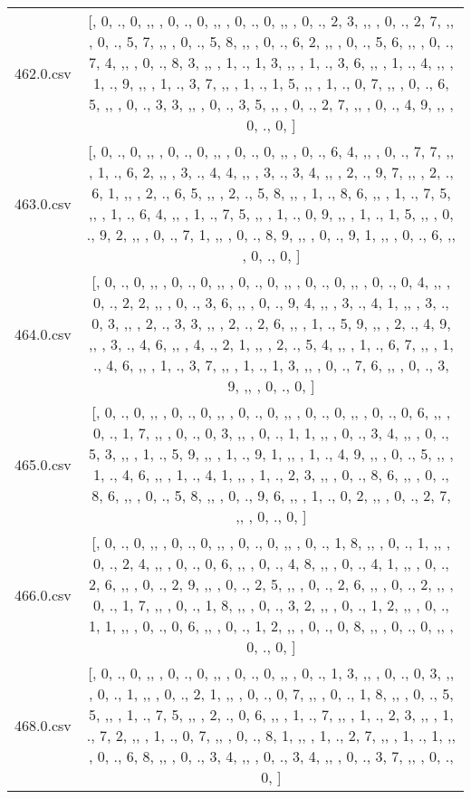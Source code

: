 \begin{table}[ht]
\begin{tabular}{@{}c c@{}}
	462.0.csv & [, 0, ., 0, ,,  , 0, ., 0, ,,  , 0, ., 0, ,,  , 0, ., 2, 3, ,,  , 0, ., 2, 7, ,,  , 0, ., 5, 7, ,,  , 0, ., 5, 8, ,,  , 0, ., 6, 2, ,,  , 0, ., 5, 6, ,,  , 0, ., 7, 4, ,,  , 0, ., 8, 3, ,,  , 1, ., 1, 3, ,,  , 1, ., 3, 6, ,,  , 1, ., 4, ,,  , 1, ., 9, ,,  , 1, ., 3, 7, ,,  , 1, ., 1, 5, ,,  , 1, ., 0, 7, ,,  , 0, ., 6, 5, ,,  , 0, ., 3, 3, ,,  , 0, ., 3, 5, ,,  , 0, ., 2, 7, ,,  , 0, ., 4, 9, ,,  , 0, ., 0, ]\\ 
	463.0.csv & [, 0, ., 0, ,,  , 0, ., 0, ,,  , 0, ., 0, ,,  , 0, ., 6, 4, ,,  , 0, ., 7, 7, ,,  , 1, ., 6, 2, ,,  , 3, ., 4, 4, ,,  , 3, ., 3, 4, ,,  , 2, ., 9, 7, ,,  , 2, ., 6, 1, ,,  , 2, ., 6, 5, ,,  , 2, ., 5, 8, ,,  , 1, ., 8, 6, ,,  , 1, ., 7, 5, ,,  , 1, ., 6, 4, ,,  , 1, ., 7, 5, ,,  , 1, ., 0, 9, ,,  , 1, ., 1, 5, ,,  , 0, ., 9, 2, ,,  , 0, ., 7, 1, ,,  , 0, ., 8, 9, ,,  , 0, ., 9, 1, ,,  , 0, ., 6, ,,  , 0, ., 0, ]\\ 
	464.0.csv & [, 0, ., 0, ,,  , 0, ., 0, ,,  , 0, ., 0, ,,  , 0, ., 0, ,,  , 0, ., 0, 4, ,,  , 0, ., 2, 2, ,,  , 0, ., 3, 6, ,,  , 0, ., 9, 4, ,,  , 3, ., 4, 1, ,,  , 3, ., 0, 3, ,,  , 2, ., 3, 3, ,,  , 2, ., 2, 6, ,,  , 1, ., 5, 9, ,,  , 2, ., 4, 9, ,,  , 3, ., 4, 6, ,,  , 4, ., 2, 1, ,,  , 2, ., 5, 4, ,,  , 1, ., 6, 7, ,,  , 1, ., 4, 6, ,,  , 1, ., 3, 7, ,,  , 1, ., 1, 3, ,,  , 0, ., 7, 6, ,,  , 0, ., 3, 9, ,,  , 0, ., 0, ]\\ 
	465.0.csv & [, 0, ., 0, ,,  , 0, ., 0, ,,  , 0, ., 0, ,,  , 0, ., 0, ,,  , 0, ., 0, 6, ,,  , 0, ., 1, 7, ,,  , 0, ., 0, 3, ,,  , 0, ., 1, 1, ,,  , 0, ., 3, 4, ,,  , 0, ., 5, 3, ,,  , 1, ., 5, 9, ,,  , 1, ., 9, 1, ,,  , 1, ., 4, 9, ,,  , 0, ., 5, ,,  , 1, ., 4, 6, ,,  , 1, ., 4, 1, ,,  , 1, ., 2, 3, ,,  , 0, ., 8, 6, ,,  , 0, ., 8, 6, ,,  , 0, ., 5, 8, ,,  , 0, ., 9, 6, ,,  , 1, ., 0, 2, ,,  , 0, ., 2, 7, ,,  , 0, ., 0, ]\\ 
	466.0.csv & [, 0, ., 0, ,,  , 0, ., 0, ,,  , 0, ., 0, ,,  , 0, ., 1, 8, ,,  , 0, ., 1, ,,  , 0, ., 2, 4, ,,  , 0, ., 0, 6, ,,  , 0, ., 4, 8, ,,  , 0, ., 4, 1, ,,  , 0, ., 2, 6, ,,  , 0, ., 2, 9, ,,  , 0, ., 2, 5, ,,  , 0, ., 2, 6, ,,  , 0, ., 2, ,,  , 0, ., 1, 7, ,,  , 0, ., 1, 8, ,,  , 0, ., 3, 2, ,,  , 0, ., 1, 2, ,,  , 0, ., 1, 1, ,,  , 0, ., 0, 6, ,,  , 0, ., 1, 2, ,,  , 0, ., 0, 8, ,,  , 0, ., 0, ,,  , 0, ., 0, ]\\ 
	468.0.csv & [, 0, ., 0, ,,  , 0, ., 0, ,,  , 0, ., 0, ,,  , 0, ., 1, 3, ,,  , 0, ., 0, 3, ,,  , 0, ., 1, ,,  , 0, ., 2, 1, ,,  , 0, ., 0, 7, ,,  , 0, ., 1, 8, ,,  , 0, ., 5, 5, ,,  , 1, ., 7, 5, ,,  , 2, ., 0, 6, ,,  , 1, ., 7, ,,  , 1, ., 2, 3, ,,  , 1, ., 7, 2, ,,  , 1, ., 0, 7, ,,  , 0, ., 8, 1, ,,  , 1, ., 2, 7, ,,  , 1, ., 1, ,,  , 0, ., 6, 8, ,,  , 0, ., 3, 4, ,,  , 0, ., 3, 4, ,,  , 0, ., 3, 7, ,,  , 0, ., 0, ]\\ 

\end{tabular}
\end{table}
